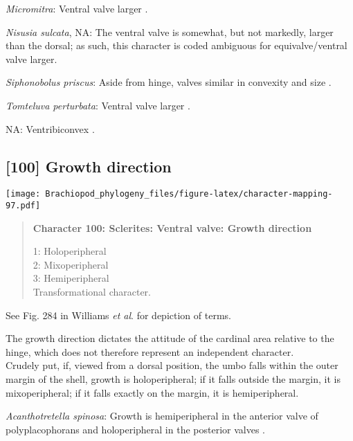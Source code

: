 \documentclass[openany]{book}
\theoremstyle{definition}
\theoremstyle{definition}
\theoremstyle{definition}
\theoremstyle{remark}
\begin{document}
\hypertarget{Micromitra-coding-99}{}
\emph{Micromitra}: Ventral valve larger \citep[see][fig.
125.]{Williams2000LinguliformeaCraniiformea}.

\hypertarget{Nisusia_sulcata-coding-99}{}
\emph{Nisusia sulcata}, NA: The ventral valve is somewhat, but not
markedly, larger than the dorsal; as such, this character is coded
ambiguous for equivalve/ventral valve larger.

\hypertarget{Siphonobolus_priscus-coding-99}{}
\emph{Siphonobolus priscus}: Aside from hinge, valves similar in
convexity and size \citep{Balthasar2008iMummpikia}.

\hypertarget{Tomteluva_perturbata-coding-99}{}
\emph{Tomteluva perturbata}: Ventral valve larger \citep[see][fig.
126.]{Williams2000LinguliformeaCraniiformea}.

\hypertarget{NA-coding-99}{}
NA: Ventribiconvex \citep{Popov2009Earlyontogeny}.

\subsection*{{[}100{]} Growth direction}\label{growth-direction-1}

\texttt{[image: Brachiopod\_phylogeny\_files/figure-latex/character-mapping-97.pdf]}

\begin{quote}
\textbf{Character 100: Sclerites: Ventral valve: Growth direction}

1: Holoperipheral\\
2: Mixoperipheral\\
3: Hemiperipheral\\
Transformational character.
\end{quote}

See Fig. 284 in Williams \emph{et al}.
\citeyearpar{Williams1997Introduction} for depiction of terms.

The growth direction dictates the attitude of the cardinal area relative
to the hinge, which does not therefore represent an independent
character.\\
Crudely put, if, viewed from a dorsal position, the umbo falls within
the outer margin of the shell, growth is holoperipheral; if it falls
outside the margin, it is mixoperipheral; if it falls exactly on the
margin, it is hemiperipheral.

\hypertarget{Acanthotretella_spinosa-coding-100}{}
\emph{Acanthotretella spinosa}: Growth is hemiperipheral in the anterior
valve of polyplacophorans and holoperipheral in the posterior valves
\citep{Schwabe2010, Connors2012}.
\end{document}
